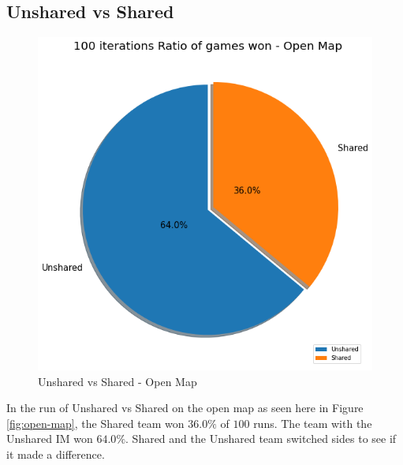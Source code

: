 \documentclass[]{report}
\begin{document}
		\clearpage
		\subsection{Unshared vs Shared}
		\begin{figure}[h!]
			\centering
			\includegraphics[width=0.9\linewidth]{"Images/100 Games Unshared vs Shared Open Map"}
			\caption[Unshared vs Shared - Open Map]{Unshared vs Shared - Open Map}
			\label{fig:100-games-unshared-vs-shared-open-map}
		\end{figure}
		In the run of Unshared vs Shared on the open map as seen here in Figure \ref{fig:open-map}, the Shared team won $36.0\%$ of $100$ runs. The team with the Unshared \ac{IM} won $64.0\%$. Shared and the Unshared team switched sides to see if it made a difference. 
		
		\clearpage
\end{document}
